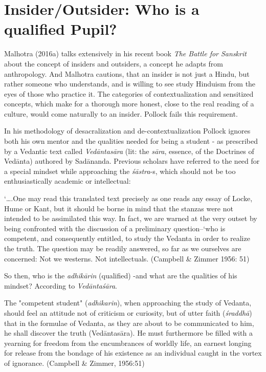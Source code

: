 \section*{Insider/Outsider: Who is a qualified Pupil?}

Malhotra (2016a) talks extensively in his recent book \textit{The Battle for Sanskrit} about the concept of insiders and outsiders, a concept he adapts from anthropology. And Malhotra cautions, that an insider is not just a Hindu, but rather someone who understands, and is willing to see study Hinduism from the eyes of those who practice it. The categories of contextualization and sensitized concepts, which make for a thorough more honest, close to the real reading of a culture, would come naturally to an insider. Pollock fails this requirement.

In his methodology of desacralization and de-contextualization Pollock ignores both his own mentor and the qualities needed for being a student - as prescribed by a Vedantic text called \textit{Vedāntasāra} (lit: the \textit{sāra}, essence, of the Doctrines of Vedānta) authored by Sadānanda. Previous scholars have referred to the need for a special mindset while approaching the \textit{śāstra}-s, which should not be too enthusiastically academic or intellectual:

\begin{myquote}
‘….One may read this translated text precisely as one reads any essay of Locke, Hume or Kant, but it should be borne in mind that the stanzas were not intended to be assimilated this way. In fact, we are warned at the very outset by being confronted with the discussion of a preliminary question--‘who is competent, and consequently entitled, to study the Vedanta in order to realize the truth. The question may be readily answered, so far as we ourselves are concerned: Not we westerns. Not intellectuals. \hfill (Campbell \& Zimmer 1956: 51)
\end{myquote}

So then, who is the \textit{adhikārin} (qualified) -and what are the qualities of his mindset? According to \textit{Vedāntaśāra}.

\begin{myquote}
The "competent student" (\textit{adhikarin}), when approaching the study of Vedanta, should feel an attitude not of criticism or curiosity, but of utter faith (\textit{śraddhā}) that in the formulae of Vedanta, as they are about to be communicated to him, he shall discover the truth (Vedāntasāra). He must furthermore be filled with a yearning for freedom from the encumbrances of worldly life, an earnest longing for release from the bondage of his existence as an individual caught in the vortex of ignorance. \hfill (Campbell \& Zimmer, 1956:51)
\end{myquote}

